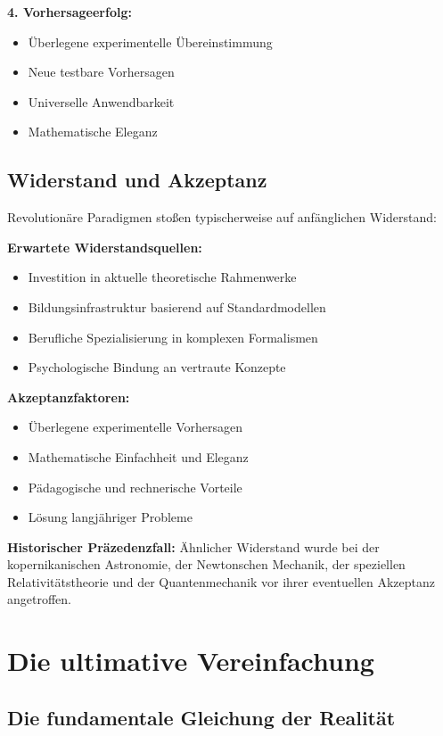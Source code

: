 \documentclass[12pt,a4paper]{report}
\begin{document}
	\textbf{4. Vorhersageerfolg:}
	\begin{itemize}
		\item Überlegene experimentelle Übereinstimmung
		\item Neue testbare Vorhersagen
		\item Universelle Anwendbarkeit
		\item Mathematische Eleganz
	\end{itemize}
	
	\subsection{Widerstand und Akzeptanz}
	\label{subsec:resistance_acceptance}
	
	Revolutionäre Paradigmen stoßen typischerweise auf anfänglichen Widerstand:
	
	\textbf{Erwartete Widerstandsquellen:}
	\begin{itemize}
		\item Investition in aktuelle theoretische Rahmenwerke
		\item Bildungsinfrastruktur basierend auf Standardmodellen
		\item Berufliche Spezialisierung in komplexen Formalismen
		\item Psychologische Bindung an vertraute Konzepte
	\end{itemize}
	
	\textbf{Akzeptanzfaktoren:}
	\begin{itemize}
		\item Überlegene experimentelle Vorhersagen
		\item Mathematische Einfachheit und Eleganz
		\item Pädagogische und rechnerische Vorteile
		\item Lösung langjähriger Probleme
	\end{itemize}
	
	\textbf{Historischer Präzedenzfall:}
	Ähnlicher Widerstand wurde bei der kopernikanischen Astronomie, der Newtonschen Mechanik, der speziellen Relativitätstheorie und der Quantenmechanik vor ihrer eventuellen Akzeptanz angetroffen.
	
	\section{Die ultimative Vereinfachung}
	\label{sec:ultimate_simplification}
	
	\subsection{Die fundamentale Gleichung der Realität}
	\label{subsec:fundamental_equation}
	
\end{document}
